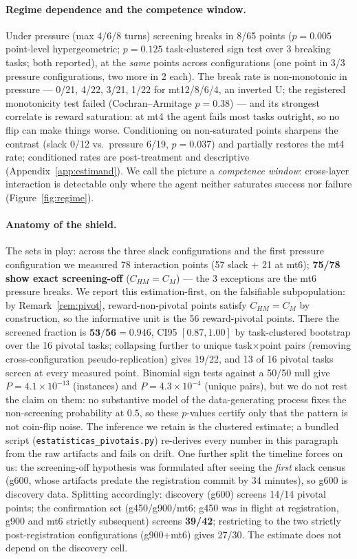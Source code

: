 \documentclass{article}
\theoremstyle{remark}
\begin{document}
\paragraph{Regime dependence and the competence window.} Under pressure
(max 4/6/8 turns) screening breaks in 8/65 points ($p = 0.005$
point-level hypergeometric; $p = 0.125$ task-clustered sign test over 3
breaking tasks; both reported), at the \emph{same} points across
configurations (one point in 3/3 pressure configurations, two more in 2
each). The break rate is non-monotonic in pressure --- 0/21, 4/22, 3/21,
1/22 for mt12/8/6/4, an inverted U; the registered monotonicity test
failed (Cochran--Armitage $p = 0.38$) --- and its strongest correlate is
reward saturation: at mt4 the agent fails most tasks outright, so no flip
can make things worse. Conditioning on non-saturated points sharpens the
contrast (slack 0/12 vs.\ pressure 6/19, $p = 0.037$) and partially
restores the mt4 rate; conditioned rates are post-treatment and
descriptive (Appendix~\ref{app:estimand}). We call the picture a
\emph{competence window}: cross-layer interaction is detectable only
where the agent neither saturates success nor failure
(Figure~\ref{fig:regime}).

\paragraph{Anatomy of the shield.} The sets in play: across the three slack
configurations and the first pressure configuration we measured 78
interaction points (57 slack + 21 at mt6); \textbf{75/78 show exact
screening-off} ($C_{HM} = C_M$) --- the 3 exceptions are the mt6 pressure
breaks. We report this estimation-first, on the falsifiable subpopulation:
by Remark~\ref{rem:pivot}, reward-non-pivotal points satisfy $C_{HM} = C_M$
by construction, so the informative unit is the 56 reward-pivotal points.
There the screened fraction is $\mathbf{53/56} = 0.946$, CI95 $[0.87, 1.00]$
by task-clustered bootstrap over the 16 pivotal tasks; collapsing further to
unique task$\times$point pairs (removing cross-configuration
pseudo-replication) gives 19/22, and 13 of 16 pivotal tasks screen at every
measured point. Binomial sign tests against a 50/50 null give
$P = 4.1\times10^{-13}$ (instances) and $P = 4.3\times10^{-4}$ (unique
pairs), but we do not rest the claim on them: no substantive model of the
data-generating process fixes the non-screening probability at $0.5$, so
these $p$-values certify only that the pattern is not coin-flip noise. The
inference we retain is the clustered estimate; a bundled script
(\texttt{estatisticas\_pivotais.py}) re-derives every number in this
paragraph from the raw artifacts and fails on drift. One further split the
timeline forces on us: the screening-off hypothesis was formulated after
seeing the \emph{first} slack census (g600, whose artifacts predate the
registration commit by 34 minutes), so g600 is discovery data. Splitting
accordingly: discovery (g600) screens 14/14 pivotal points; the
confirmation set (g450/g900/mt6; g450 was in flight at registration, g900
and mt6 strictly subsequent) screens \textbf{39/42}; restricting to the two
strictly post-registration configurations (g900+mt6) gives 27/30. The
estimate does not depend on the discovery cell.
\end{document}
